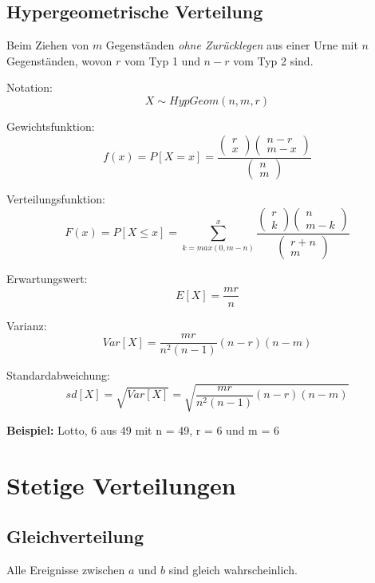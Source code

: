 \documentclass[10pt,a4paper,twocolumn]{article}
\begin{document}
\subsection{Hypergeometrische Verteilung}
Beim Ziehen von $m$ Gegenständen \emph{ohne Zurücklegen} aus einer Urne mit $n$ Gegenständen, wovon $r$ vom Typ 1 und $n-r$ vom Typ 2 sind.

\vspace{10pt}

Notation:
\[
X \sim HypGeom(n,m,r)
\]

Gewichtsfunktion:
\[
f(x)=P[X=x]=\frac{
\left(
	\begin{array}{c}
		r \\ x
	\end{array}
\right)
\left(
	\begin{array}{c}
		n-r \\ m-x
	\end{array}
\right)
}{
\left(
	\begin{array}{c}
		n \\ m
	\end{array}
\right)
}
\]

Verteilungsfunktion:
\[
F(x)=P[X \leq x]=
\sum \limits_{k=max(0,m-n)}^x \frac{
\left(
	\begin{array}{c}
		r \\ k
	\end{array}
\right)
\left(
	\begin{array}{c}
		n \\ m-k
	\end{array}
\right)
}{
\left(
	\begin{array}{c}
		r+n \\ m
	\end{array}
\right)
}
\]

Erwartungswert:
\[
E[X]=\frac{mr}{n}
\]

Varianz:
\[
Var[X]=\frac{mr}{n^2(n-1)}(n-r)(n-m)
\]

Standardabweichung:
\[
sd[X]=\sqrt{Var[X]}=\sqrt{\frac{mr}{n^2(n-1)}(n-r)(n-m)}
\]

\textbf{Beispiel:} Lotto, 6 aus 49 mit n = 49, r = 6 und m = 6

\section{Stetige Verteilungen}

\subsection{Gleichverteilung}
Alle Ereignisse zwischen $a$ und $b$ sind gleich wahrscheinlich.
\end{document}
